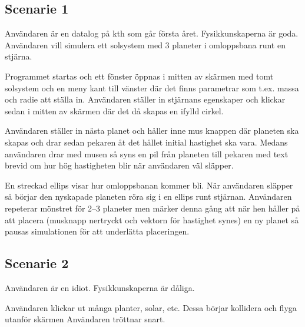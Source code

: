 
\subsection{Scenarie 1}

Användaren är en datalog på kth som går första året.
Fysikkunskaperna är goda.
Användaren vill simulera ett solsystem med 3 planeter
i omloppsbana runt en stjärna.

Programmet startas och ett fönster öppnas i mitten av skärmen
med tomt solsystem och en meny kant till vänster där det finns
parametrar som t.ex. massa och radie att ställa in.
Användaren ställer in stjärnans egenskaper och klickar
sedan i mitten av skärmen där det då skapas en ifylld cirkel.

Användaren ställer in nästa planet och håller inne mus knappen där
planeten ska skapas och drar sedan pekaren åt det hållet initial
hastighet ska vara.
Medans användaren drar med musen så syns en pil från planeten till
pekaren med text brevid om hur hög hastigheten blir när användaren väl släpper.

En streckad ellips visar hur omloppsbanan kommer bli.
När användaren släpper så börjar den nyskapade planeten röra sig
i en ellips runt stjärnan.
Användaren repeterar mönstret för 2--3 planeter men märker denna gång
att när hen håller på att placera (musknapp nertryckt och vektorn
för hastighet synes) en ny planet så pausas simulationen för att
underlätta placeringen.

\subsection{Scenarie 2}

Användaren är en idiot.
Fysikkunskaperna är dåliga. %

Användaren klickar ut många planter, solar, etc.
Dessa börjar kollidera och flyga utanför skärmen %
Användaren tröttnar snart. %

